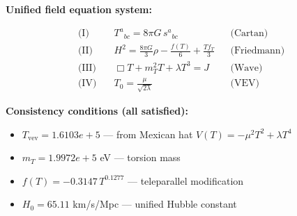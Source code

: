 
\textbf{Unified field equation system:}

\begin{align}
  \text{(I)} \quad & T^a{}_{bc} = 8\pi G \, s^a{}_{bc} && \text{(Cartan)} \\
  \text{(II)} \quad & H^2 = \frac{8\pi G}{3}\rho - \frac{f(T)}{6} + \frac{Tf_T}{3} && \text{(Friedmann)} \\
  \text{(III)} \quad & \Box T + m_T^2 T + \lambda T^3 = J && \text{(Wave)} \\
  \text{(IV)} \quad & T_0 = \frac{\mu}{\sqrt{2\lambda}} && \text{(VEV)}
\end{align}

\textbf{Consistency conditions (all satisfied):}
\begin{itemize}
  \item $T_{\text{vev}} = 1.6103e+5$ — from Mexican hat $V(T) = -\mu^2 T^2 + \lambda T^4$
  \item $m_T = 1.9972e+5$ eV — torsion mass
  \item $f(T) = -0.3147 \, T^{0.1277}$ — teleparallel modification
  \item $H_0 = 65.11$ km/s/Mpc — unified Hubble constant
\end{itemize}
